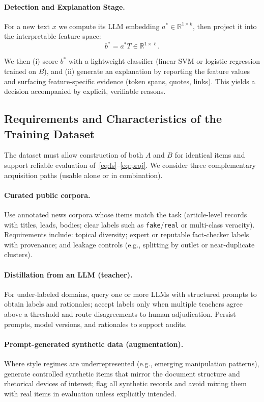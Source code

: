 \documentclass[ai,article,submit,pdftex,moreauthors]{Definitions/mdpi}
\begin{document}
\paragraph{Detection and Explanation Stage.}
For a new text $x$ we compute its LLM embedding $a^{\ast}\!\in\!\mathbb{R}^{1\times k}$, then project it into the interpretable feature space:
\begin{equation}\label{eq:proj}
b^{\ast} = a^{\ast} T \in \mathbb{R}^{1\times \ell}.
\end{equation}

We then (i) score $b^{\ast}$ with a lightweight classifier (linear SVM or logistic regression trained on $B$), and (ii) generate an explanation by reporting the feature values and surfacing feature-specific evidence (token spans, quotes, links). This yields a decision accompanied by explicit, verifiable reasons.

\subsection{Requirements and Characteristics of the Training Dataset}\label{subsec:data}
The dataset must allow construction of both $A$ and $B$ for identical items and support reliable evaluation of~\eqref{eq:ls}--\eqref{eq:proj}. We consider three complementary acquisition paths (usable alone or in combination).

\paragraph{Curated public corpora.}
Use annotated news corpora whose items match the task (article-level records with titles, leads, bodies; clear labels such as \texttt{fake}/\texttt{real} or multi-class veracity). Requirements include: topical diversity; expert or reputable fact-checker labels with provenance; and leakage controls (e.g., splitting by outlet or near-duplicate clusters).

\paragraph{Distillation from an LLM (teacher).}
For under-labeled domains, query one or more LLMs with structured prompts to obtain labels and rationales; accept labels only when multiple teachers agree above a threshold and route disagreements to human adjudication. Persist prompts, model versions, and rationales to support audits.

\paragraph{Prompt-generated synthetic data (augmentation).}
Where style regimes are underrepresented (e.g., emerging manipulation patterns), generate controlled synthetic items that mirror the document structure and rhetorical devices of interest; flag all synthetic records and avoid mixing them with real items in evaluation unless explicitly intended.
\end{document}
